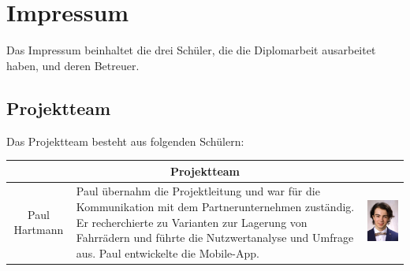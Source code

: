\section{Impressum}
Das Impressum beinhaltet die drei Schüler, die die Diplomarbeit ausarbeitet haben, und deren Betreuer.
\subsection{Projektteam}
Das Projektteam besteht aus folgenden Schülern:\\

\begin{table}[H]
  \centering
  \begin{tabular}{cp{}c}
    \multicolumn{3}{c}{\textbf{Projektteam}}                                                                                                                                                                                                                                                                                                                           \\
    \toprule
    Paul Hartmann & Paul übernahm die Projektleitung und war für die Kommunikation mit dem Partnerunternehmen zuständig. Er recherchierte zu Varianten zur Lagerung von Fahrrädern und führte die Nutzwertanalyse und Umfrage aus. Paul entwickelte die Mobile-App.          & \begin{minipage}{.3\textwidth} \includegraphics{images/paulhartmann.jpg} \end{minipage} \\

\end{tabular}
\end{table}
